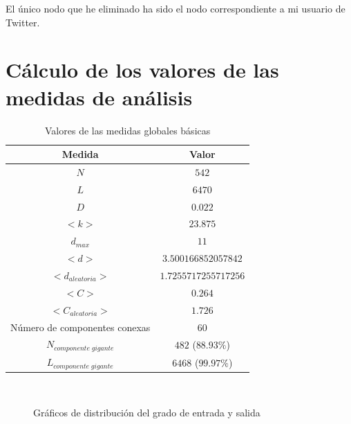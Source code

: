 \documentclass[10pt,a4paper,spanish]{article}
\numberwithin{equation}{section} %
\numberwithin{figure}{section} %
\numberwithin{table}{section} %
\begin{document}
El único nodo que he eliminado ha sido el nodo correspondiente a mi usuario de Twitter.

\section{Cálculo de los valores de las medidas de análisis}

\begin{table}[!h]
\centering
\begin{tabular}{cc}
\textbf{Medida} & \textbf{Valor} \\
\hline
$N$ & $542$ \\
$L$ & $6470$ \\
$D$ & $0.022$ \\
$<k>$ & $23.875$ \\
$d_{max}$ & $11$ \\
$<d>$ & $3.500166852057842$ \\
$<d_{aleatoria}>$ & $1.7255717255717256$ \\
$<C>$ & $0.264$ \\
$<C_{aleatoria}>$ & $1.726$ \\
Número de componentes conexas & $60$ \\
$N_{componente\;gigante}$ & $482$ ($88.93\%$) \\
$L_{componente\;gigante}$ & $6468$ ($99.97\%$) \\
\end{tabular}
\caption{Valores de las medidas globales básicas}
\label{basicglobal}
\end{table}

\begin{figure}[!h]
    \centering
    \mbox{
    }
    \caption{Gráficos de distribución del grado de entrada y salida}
    \label{degree}
\end{figure}
\end{document}
